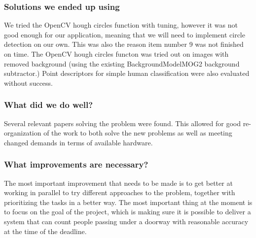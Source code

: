 \subsubsection{Solutions we ended up using}
We tried the OpenCV hough circles function with tuning, however it was not good enough for our application, meaning that we will need to implement circle detection on our own. This was also the reason item number 9 was not finished on time. The OpenCV hough circles functon was tried out on images with removed background (using the existing BackgroundModelMOG2 background subtractor.) Point descriptors for simple human classification were also evaluated without success.

\subsubsection{What did we do well?}
Several relevant papers solving the problem were found. This allowed for good re-organization of the work to both solve the new problems as well as meeting changed demands in terms of available hardware.

\subsubsection{What improvements are necessary?}
The most important improvement that needs to be made is to get better at working in parallel to try different approaches to the problem, together with prioritizing the tasks in a better way. The most important thing at the moment is to focus on the goal of the project, which is making sure it is possible to deliver a system that can count people passing under a doorway with reasonable accuracy at the time of the deadline.

\newpage

